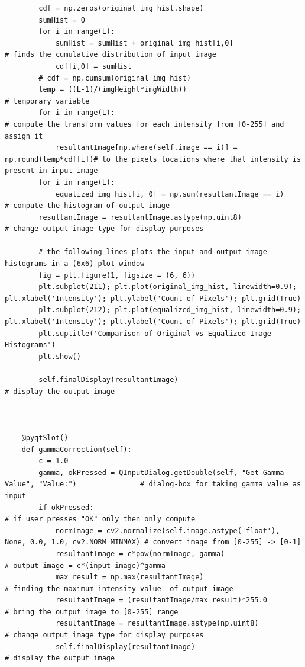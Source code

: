 \documentclass[letterpaper, 10 pt, conference]{ieeeconf}  %
\begin{document}
\begin{mdframed}
\begin{lstlisting}
        cdf = np.zeros(original_img_hist.shape)
        sumHist = 0
        for i in range(L):
            sumHist = sumHist + original_img_hist[i,0]                    # finds the cumulative distribution of input image
            cdf[i,0] = sumHist
        # cdf = np.cumsum(original_img_hist)                                   
        temp = ((L-1)/(imgHeight*imgWidth))                                       # temporary variable
        for i in range(L):                                                   # compute the transform values for each intensity from [0-255] and assign it
            resultantImage[np.where(self.image == i)] = np.round(temp*cdf[i])# to the pixels locations where that intensity is present in input image
        for i in range(L):                                                
            equalized_img_hist[i, 0] = np.sum(resultantImage == i)            # compute the histogram of output image
        resultantImage = resultantImage.astype(np.uint8)                     # change output image type for display purposes

        # the following lines plots the input and output image histograms in a (6x6) plot window
        fig = plt.figure(1, figsize = (6, 6))
        plt.subplot(211); plt.plot(original_img_hist, linewidth=0.9); plt.xlabel('Intensity'); plt.ylabel('Count of Pixels'); plt.grid(True)
        plt.subplot(212); plt.plot(equalized_img_hist, linewidth=0.9); plt.xlabel('Intensity'); plt.ylabel('Count of Pixels'); plt.grid(True)
        plt.suptitle('Comparison of Original vs Equalized Image Histograms')
        plt.show()

        self.finalDisplay(resultantImage)                                    # display the output image          


    
    @pyqtSlot()
    def gammaCorrection(self):
        c = 1.0
        gamma, okPressed = QInputDialog.getDouble(self, "Get Gamma Value", "Value:")               # dialog-box for taking gamma value as input
        if okPressed:                                                                              # if user presses "OK" only then only compute 
            normImage = cv2.normalize(self.image.astype('float'), None, 0.0, 1.0, cv2.NORM_MINMAX) # convert image from [0-255] -> [0-1]
            resultantImage = c*pow(normImage, gamma)                                               # output image = c*(input image)^gamma
            max_result = np.max(resultantImage)                                                    # finding the maximum intensity value  of output image
            resultantImage = (resultantImage/max_result)*255.0                                     # bring the output image to [0-255] range
            resultantImage = resultantImage.astype(np.uint8)                                       # change output image type for display purposes
            self.finalDisplay(resultantImage)                                                            # display the output image 


\end{lstlisting}
\end{mdframed}
\end{document}
